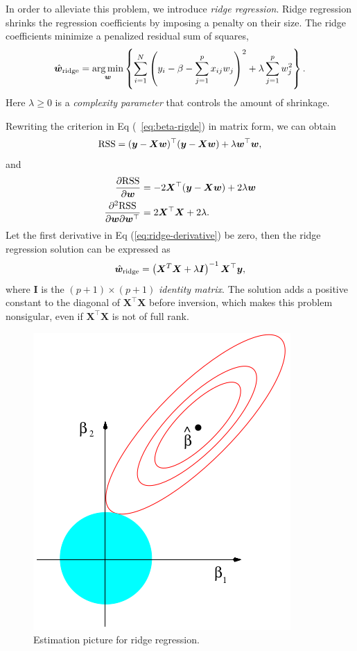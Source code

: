 In order to alleviate this problem, we introduce \emph{ridge regression}. Ridge regression shrinks the regression coefficients by imposing a penalty 
on their size. The ridge coefficients minimize a penalized residual sum of squares,
\begin{equation}\label{eq:beta-rigde}
    \hat{\bm{w}}_{\text{ridge}} = \mathop{\arg\min}_{\bm{w}} \left\{
        \sum_{i=1}^N \left(
            y_i - \beta - \sum_{j=1}^p x_{ij} w_j 
        \right)^2 + \lambda \sum_{j=1}^p w_j^2
    \right\}. 
\end{equation}
Here \(\lambda \ge 0\) is a \emph{complexity parameter} that controls the amount of shrinkage.

Rewriting the criterion in Eq (~\ref{eq:beta-rigde}) in matrix form, we can obtain
\begin{equation}
    \mathrm{RSS} = (\bm{y} - \bm{Xw})^\top (\bm{y} - \bm{Xw}) + \lambda \bm{w}^\top \bm{w},
\end{equation}
and
\begin{equation}\label{eq:ridge-derivative}
    \begin{aligned}
        \pdv{\mathrm{RSS}}{\bm{w}} &= -2\bm{X}^\top (\bm{y} - \bm{Xw}) + 2\lambda\bm{w}\\
        \pdv{\mathrm{RSS}}{\bm{w}}{\bm{w}^\top} &= 2\bm{X}^\top\bm{X} + 2\lambda.
    \end{aligned}
\end{equation}
Let the first derivative in Eq (\ref{eq:ridge-derivative}) be zero, then the ridge regression solution can be expressed as 
\begin{equation}
    \hat{\bm{w}}_{\text{ridge}} = \left( \bm{X}^T \bm{X} + \lambda \bm{I} \right)^{-1} \bm{X}^\top \bm{y},
\end{equation}
where \(\bm{I}\) is the \((p+1) \times (p+1)\) \emph{identity matrix}.
The solution adds a positive constant to the diagonal of \(\bm{X}^\top \bm{X}\) before inversion, which makes this problem
nonsigular, even if \(\bm{X}^\top \bm{X}\) is not of full rank.

\begin{figure}[!htbp]
    \centering
    \includegraphics[scale = 0.4]{fig/ridge-reg.png}
    \caption{Estimation picture for ridge regression.}
    \label{fig:ridge-reg}
\end{figure}